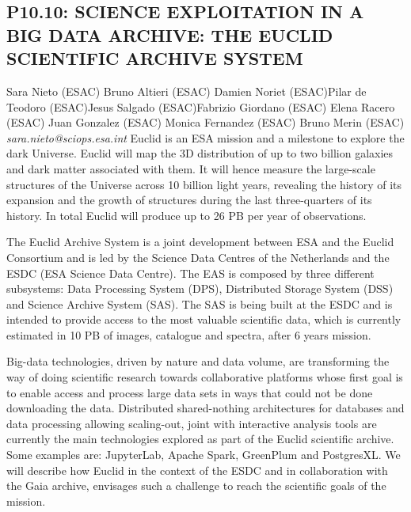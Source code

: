 \documentclass{report}
\begin{document}
\subsection*{P10.10: SCIENCE EXPLOITATION IN A BIG DATA ARCHIVE: THE EUCLID SCIENTIFIC ARCHIVE SYSTEM}
\bigskip
Sara Nieto (ESAC) \newline Bruno Altieri (ESAC) \newline  Damien Noriet (ESAC)\newline  Pilar de Teodoro (ESAC)\newline Jesus Salgado (ESAC)\newline  Fabrizio Giordano (ESAC)
Elena Racero (ESAC)
Juan Gonzalez (ESAC)
Monica Fernandez (ESAC)
Bruno Merin (ESAC)\newline\newline
{\it sara.nieto@sciops.esa.int}\newline
\newline\newline
Euclid is an ESA mission and a milestone to explore the dark Universe. Euclid will map the 3D distribution of up to two billion galaxies and dark matter associated with them. It will hence measure the large-scale structures of the Universe across 10 billion light years, revealing the history of its expansion and the growth of structures during the last three-quarters of its history. In total Euclid will produce up to 26 PB per year of observations. 

The Euclid Archive System is a joint development between ESA and the Euclid Consortium and is led by the Science Data Centres of the Netherlands and the ESDC (ESA Science Data Centre). The EAS is composed by three different subsystems: Data Processing System (DPS), Distributed Storage System (DSS) and Science Archive System (SAS). The SAS is being built at the ESDC and is intended to provide access to the most valuable scientific data, which is currently estimated in 10 PB of images, catalogue and spectra, after 6 years mission.

Big-data technologies, driven by nature and data volume, are transforming the way of doing scientific research towards collaborative platforms whose first goal is to enable access and process large data sets in ways that could not be done downloading the data. Distributed shared-nothing architectures for databases and data processing allowing scaling-out, joint with interactive analysis tools are currently the main technologies explored as part of the Euclid scientific archive. Some examples are: JupyterLab, Apache Spark, GreenPlum and PostgresXL. 
We will describe how Euclid in the context of the ESDC and in collaboration with the Gaia archive, envisages such a challenge to reach the scientific goals of the mission.\newline
\newpage
\end{document}
